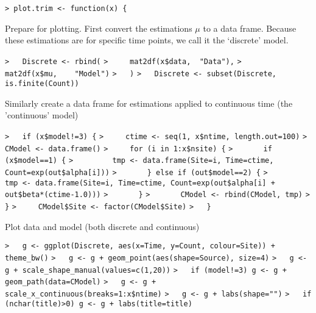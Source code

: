 \documentclass[a4paper]{article}
\begin{document}
\verb~> plot.trim <- function(x) {~\par
Prepare for plotting. First convert the estimations $\mu$ to a data frame.
Because these estimations are for specific time points, we call it the `discrete' model.\par
\verb~>   Discrete <- rbind(~\newline
\verb~>     mat2df(x$data,  "Data"),~\newline
\verb~>     mat2df(x$mu,    "Model")~\newline
\verb~>   )~\newline
\verb~>   Discrete <- subset(Discrete, is.finite(Count))~\par

Similarly create a data frame for estimations applied to continuous time (the 'continuous' model)\par
\verb~>   if (x$model!=3) {~\newline
\verb~>     ctime <- seq(1, x$ntime, length.out=100)~\newline
\verb~>     CModel <- data.frame()~\newline
\verb~>     for (i in 1:x$nsite) {~\newline
\verb~>       if (x$model==1) {~\newline
\verb~>         tmp <- data.frame(Site=i, Time=ctime, Count=exp(out$alpha[i]))~\newline
\verb~>       } else if (out$model==2) {~\newline
\verb~>         tmp <- data.frame(Site=i, Time=ctime, Count=exp(out$alpha[i] + out$beta*(ctime-1.0)))~\newline
\verb~>       }~\newline
\verb~>       CModel <- rbind(CModel, tmp)~\newline
\verb~>     }~\newline
\verb~>     CModel$Site <- factor(CModel$Site)~\newline
\verb~>   }~\par

Plot data and model (both discrete and continuous)\par
\verb~>   g <- ggplot(Discrete, aes(x=Time, y=Count, colour=Site)) + theme_bw()~\newline
\verb~>   g <- g + geom_point(aes(shape=Source), size=4)~\newline
\verb~>   g <- g + scale_shape_manual(values=c(1,20))~\newline
\verb~>   if (model!=3) g <- g + geom_path(data=CModel)~\newline
\verb~>   g <- g + scale_x_continuous(breaks=1:x$ntime)~\newline
\verb~>   g <- g + labs(shape="")~\newline
\verb~>   if (nchar(title)>0) g <- g + labs(title=title)~\par
\end{document}
